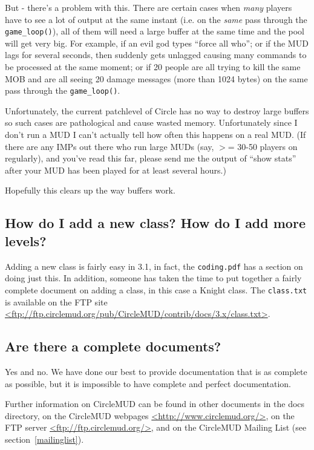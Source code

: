 \documentclass[11pt]{article}
\begin{document}
\par
But - there's a problem with this.  There are certain cases when {\em many} players have to see a lot of output at the same instant (i.e. on the {\em same} pass through the \texttt{game\_loop()}), all of them will need a large buffer at the same time and the pool will get very big.  For example, if
an evil god types ``force all who''; or if the MUD lags for several seconds, then suddenly gets unlagged causing many commands to be processed at the same moment; or if 20 people are all trying to kill the same MOB and are all seeing 20 damage messages (more than 1024 bytes) on the same pass through the \texttt{game\_loop()}.
\par
Unfortunately, the current patchlevel of Circle has no way to destroy large buffers so such cases are pathological and cause wasted memory.  Unfortunately since I don't run a MUD I can't actually tell how often this happens on a real MUD.  (If there are any IMPs out there who run large MUDs (say, $>$= 30-50 players on regularly), and you've read this far, please send me the output of ``show stats'' after your MUD has been played for at least several hours.) 
\par
Hopefully this clears up the way buffers work.

\subsection{How do I add a new class?  How do I add more levels?}
Adding a new class is fairly easy in 3.1, in fact, the \texttt{coding.pdf} has a section on doing just this.  In addition, someone has taken the time to put together a fairly complete document on adding a class, in this case a Knight class. The \texttt{class.txt} is available on the FTP site \url{<ftp://ftp.circlemud.org/pub/CircleMUD/contrib/docs/3.x/class.txt>}.

\subsection{Are there a complete documents?}
Yes and no.  We have done our best to provide documentation that is as complete as possible, but it is impossible to have complete and perfect documentation.  
\par
Further information on CircleMUD can be found in other documents in the docs directory, on the CircleMUD webpages \url{<http://www.circlemud.org/>}, on the FTP server \url{<ftp://ftp.circlemud.org/>}, and on the CircleMUD Mailing List (see section~\vref{mailinglist}).
\end{document}
